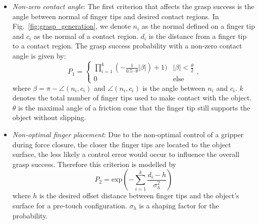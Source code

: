 \begin{itemize}
\item \textit{Non-zero contact angle}: 
 The first criterion that affects the grasp success is the angle between normal of finger tips and desired contact regions. In Fig.~\ref{fig:grasp_generation}, we denote $n_i$ as the normal defined on a finger tip and $c_i$ as the normal of a contact region. $d_i$ is the distance from a finger tip to a contact region. The grasp success probability with a non-zero contact angle is given by:
\begin{equation}
P_1 = \begin{cases}
\prod_{i=1}^{k}(-\frac{1}{0.5\cdot \theta} |\beta|) + 1 )  & |\beta | < \frac{\theta}{2}\\
  0   & \text{else}
\end{cases},
\end{equation} 
where $\beta = \pi - \angle(n_i,c_i)$ and $\angle(n_i,c_i)$ is the angle between $n_i$ and $c_i$.  $k$ denotes the total number of finger tips used to make contact with the object. $\theta$ is the maximal angle of a friction cone that the finger tip still supports the object without slipping. 
\item \textit{Non-optimal finger placement}:
Due to the non-optimal control of a gripper during force closure, the closer the finger tips are located to the object surface, the less likely a control error would occur to influence the overall grasp success. Therefore this criterion is modelled by 
\begin{equation} 
P_2 = \text{exp}\left(-\sum_{i=1}^k \frac{d_i-h}{\sigma_h^2}\right)
\end{equation}
where $h$ is the desired offset distance between finger tips and the object's surface for a pre-touch configuration. $\sigma_h$ is a shaping factor for the probability. 

 


\end{itemize}
